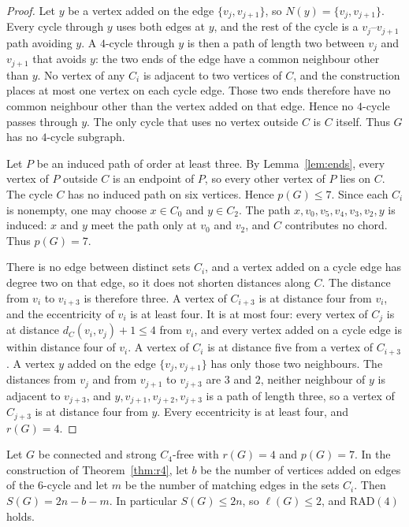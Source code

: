 \documentclass[ASNA]{USG}
\theoremstyle{WBstyletwo}
\numberwithin{equation}{section}
\newcommand{\lr}{\ell}
\newcommand{\pp}{p}
\newcommand{\RAD}{\mathrm{RAD}}
\begin{document}
\begin{proof}
Let $y$ be a vertex added on the edge $\{v_j,v_{j+1}\}$, so $N(y)=\{v_j,v_{j+1}\}$. Every cycle through $y$ uses both edges at $y$, and the rest of the cycle is a $v_j$--$v_{j+1}$ path avoiding $y$. A $4$-cycle through $y$ is then a path of length two between $v_j$ and $v_{j+1}$ that avoids $y$: the two ends of the edge have a common neighbour other than $y$. No vertex of any $C_i$ is adjacent to two vertices of $C$, and the construction places at most one vertex on each cycle edge. Those two ends therefore have no common neighbour other than the vertex added on that edge. Hence no $4$-cycle passes through $y$. The only cycle that uses no vertex outside $C$ is $C$ itself. Thus $G$ has no $4$-cycle subgraph.

Let $P$ be an induced path of order at least three. By Lemma~\ref{lem:ends}, every vertex of $P$ outside $C$ is an endpoint of $P$, so every other vertex of $P$ lies on $C$. The cycle $C$ has no induced path on six vertices. Hence $\pp(G)\le 7$. Since each $C_i$ is nonempty, one may choose $x\in C_0$ and $y\in C_2$. The path $x,v_0,v_5,v_4,v_3,v_2,y$ is induced: $x$ and $y$ meet the path only at $v_0$ and $v_2$, and $C$ contributes no chord. Thus $\pp(G)=7$.

There is no edge between distinct sets $C_i$, and a vertex added on a cycle edge has degree two on that edge, so it does not shorten distances along $C$. The distance from $v_i$ to $v_{i+3}$ is therefore three. A vertex of $C_{i+3}$ is at distance four from $v_i$, and the eccentricity of $v_i$ is at least four. It is at most four: every vertex of $C_j$ is at distance $d_C(v_i,v_j)+1\le 4$ from $v_i$, and every vertex added on a cycle edge is within distance four of $v_i$. A vertex of $C_i$ is at distance five from a vertex of $C_{i+3}$. A vertex $y$ added on the edge $\{v_j,v_{j+1}\}$ has only those two neighbours. The distances from $v_j$ and from $v_{j+1}$ to $v_{j+3}$ are $3$ and $2$, neither neighbour of $y$ is adjacent to $v_{j+3}$, and $y,v_{j+1},v_{j+2},v_{j+3}$ is a path of length three, so a vertex of $C_{j+3}$ is at distance four from $y$. Every eccentricity is at least four, and $r(G)=4$.
\end{proof}

\begin{corollary}\label{cor:r4mass}
Let $G$ be connected and strong $C_4$-free with $r(G)=4$ and $\pp(G)=7$. In the construction of Theorem~\ref{thm:r4}, let $b$ be the number of vertices added on edges of the $6$-cycle and let $m$ be the number of matching edges in the sets $C_i$. Then $S(G)=2n-b-m$. In particular $S(G)\le 2n$, so $\lr(G)\le 2$, and $\RAD(4)$ holds.
\end{corollary}
\end{document}

